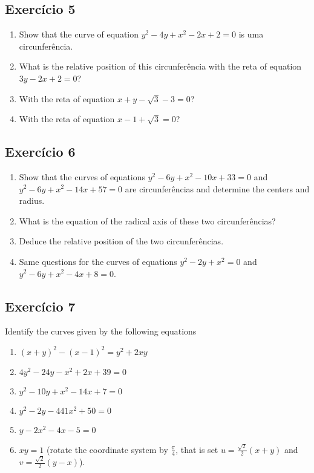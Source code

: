 \subsection*{Exercício 5}

\begin{enumerate}
\item Show that the curve of equation $y^2-4y+x^2-2x+2 = 0$ is uma
  circunferência.
\item  What is the relative position of this circunferência with the
  reta of equation $3y-2x+2=0$?
\item With the reta of equation $x + y - \sqrt{3} - 3 = 0$?
\item With the reta of equation $x - 1 +\sqrt{3} = 0$?
\end{enumerate}

\subsection*{Exercício 6}

\begin{enumerate}
\item Show that the curves of equations
  $y^2-6y+x^2-10x+33=0$ and
  $y^2-6y+x^2-14x+57=0$ are circunferências and determine the centers
  and radius.
\item What is the equation of the radical axis of these two circunferências?
\item Deduce the relative position of the two circunferências.
\item Same questions for the curves of equations
  $y^2-2y+x^2=0$ and $y^2-6y+x^2-4x+8=0$.
\end{enumerate}

\subsection*{Exercício 7}

Identify the curves given by the following equations

\begin{enumerate}
  \item ${(x+y)}^2 - {(x-1)}^2 = y^2 + 2xy$
  \item $4y^2-24y-x^2+2x+39=0$
  \item $y^2-10y+x^2-14x+7=0$
  \item $y^2-2y-441x^2+50=0$
  \item $y - 2x^2-4x-5=0$
  \item $xy = 1$ (rotate the coordinate system by $\frac{\pi}{4}$, that
    is set $u = \frac{\sqrt{2}}{2}\left(x+y\right)$ and
    $v = \frac{\sqrt{2}}{2}\left(y-x\right)$).
\end{enumerate}

